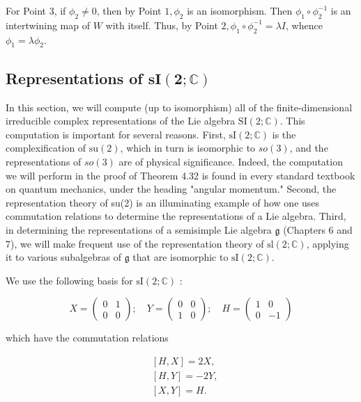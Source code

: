 \documentclass[10pt, letterpaper]{article}
\begin{document}
For Point 3, if $\phi_{2} \neq 0$, then by Point $1, \phi_{2}$ is an isomorphism. Then $\phi_{1} \circ \phi_{2}^{-1}$ is an intertwining map of $W$ with itself. Thus, by Point $2, \phi_{1} \circ \phi_{2}^{-1}=\lambda I$, whence $\phi_{1}=\lambda \phi_{2}$.

\subsection*{Representations of $\mathbf{s I}(\mathbf{2} ; \mathbb{C})$}
In this section, we will compute (up to isomorphism) all of the finite-dimensional irreducible complex representations of the Lie algebra $\mathrm{SI}(2 ; \mathbb{C})$. This computation is important for several reasons. First, $\mathrm{sI}(2 ; \mathbb{C})$ is the complexification of $\mathrm{su}(2)$, which in turn is isomorphic to $s o(3)$, and the representations of $s o(3)$ are of physical significance. Indeed, the computation we will perform in the proof of Theorem 4.32 is found in every standard textbook on quantum mechanics, under the heading "angular momentum." Second, the representation theory of su(2) is an illuminating example of how one uses commutation relations to determine the representations of a Lie algebra. Third, in determining the representations of a semisimple Lie algebra $\mathfrak{g}$ (Chapters 6 and 7), we will make frequent use of the representation theory of $\mathrm{sl}(2 ; \mathbb{C})$, applying it to various subalgebras of $\mathfrak{g}$ that are isomorphic to $\mathrm{sI}(2 ; \mathbb{C})$.

We use the following basis for $\mathrm{sI}(2 ; \mathbb{C})$ :

$$
X=\left(\begin{array}{ll}
0 & 1 \\
0 & 0
\end{array}\right) ; \quad Y=\left(\begin{array}{ll}
0 & 0 \\
1 & 0
\end{array}\right) ; \quad H=\left(\begin{array}{rr}
1 & 0 \\
0 & -1
\end{array}\right)
$$

which have the commutation relations

$$
\begin{aligned}
& {[H, X]=2 X,} \\
& {[H, Y]=-2 Y,} \\
& {[X, Y]=H .}
\end{aligned}
$$
\end{document}
